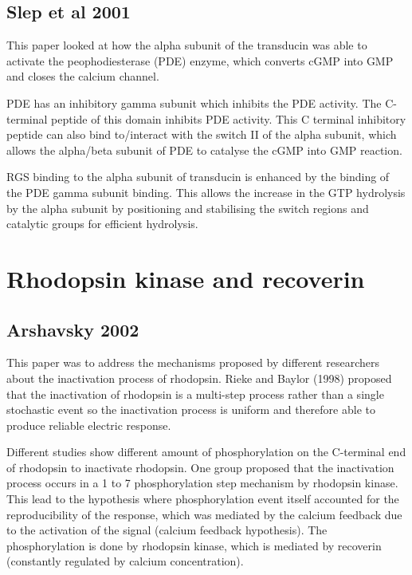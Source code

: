 \documentclass[a4paper,12pt]{article}
\begin{document}
\subsection*{Slep et al 2001}

This paper looked at how the alpha subunit of the transducin was able to activate the peophodiesterase (PDE) enzyme, which converts cGMP into GMP and closes the calcium channel.

PDE has an inhibitory gamma subunit which inhibits the PDE activity.
The C-terminal peptide of this domain inhibits PDE activity.
This C terminal inhibitory peptide can also bind to/interact with the switch II of the alpha subunit, which allows the alpha/beta subunit of PDE to catalyse the cGMP into GMP reaction.

RGS binding to the alpha subunit of transducin is enhanced by the binding of the PDE gamma subunit binding.
This allows the increase in the GTP hydrolysis by the alpha subunit by positioning and stabilising the switch regions and catalytic groups for efficient hydrolysis.

\section*{Rhodopsin kinase and recoverin}

\subsection*{Arshavsky 2002}

This paper was to address the mechanisms proposed by different researchers about the inactivation process of  rhodopsin.
Rieke and Baylor (1998) proposed that the inactivation of rhodopsin is a multi-step process rather than a single stochastic event so the inactivation process is uniform and therefore able to produce reliable electric response.

Different studies show different amount of phosphorylation on the C-terminal end of rhodopsin to inactivate rhodopsin.
One group proposed that the inactivation process occurs in a 1 to 7 phosphorylation step mechanism by rhodopsin kinase.
This lead to the hypothesis where phosphorylation event itself accounted for the reproducibility of the response, which was mediated by the calcium feedback due to the activation of the signal (calcium feedback hypothesis).
The phosphorylation is done by rhodopsin kinase, which is mediated by recoverin (constantly regulated by calcium concentration).
\end{document}
